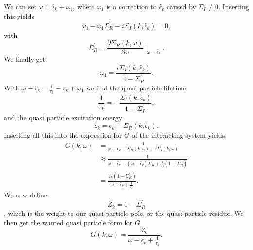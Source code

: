 We can set $\omega=\widetilde{\epsilon_k}+\omega_1$, where $\omega_1$ is a correction to $\widetilde{\epsilon_k}$ caused by $\Sigma_I\neq 0$. Inserting this yields
\begin{equation}
\omega_1-\omega_1\Sigma_R^{\prime}-i\Sigma_I(k,\widetilde{\epsilon_k})=0,
\end{equation}
with
\begin{equation}
\Sigma_R^{\prime}=\frac{\partial \Sigma_R(k,\omega)}{\partial \omega}\mid_{\omega=\widetilde{\epsilon_k}}.
\end{equation}
We finally get
\begin{equation}
\omega_1=\frac{i\Sigma_I(k,\widetilde{\epsilon_k})}{1-\Sigma_R^{\prime}}.
\end{equation}
With $\omega=\widetilde{\epsilon_k}-\frac{i}{\tau_k}=\widetilde{\epsilon_k}+\omega_1$ we find the quasi particle lifetime
\begin{equation}
\frac{1}{\tau_k}=-\frac{\Sigma_I(k,\widetilde{\epsilon_k})}{1-\Sigma_R^{\prime}},
\end{equation}
and the quasi particle excitation energy
\begin{equation}
\widetilde{\epsilon_k}=\epsilon_k+\Sigma_R(k,\widetilde{\epsilon_k}).
\end{equation}
Inserting all this into the expression for $G$ of the interacting system yields
\begin{align}
G(k,\omega)&=\frac{1}{\omega-\epsilon_k-\Sigma_R(k,\omega)-i\Sigma_I(k,\omega)}\\
&\approx\frac{1}{\omega-\widetilde{\epsilon_k}-(\omega-\widetilde{\epsilon_k})\Sigma_R^{\prime}+\frac{i}{\tau_k}(1-\Sigma_R^{\prime})}\\
&=\frac{1/(1-\Sigma_R^{\prime})}{\omega-\widetilde{\epsilon_k}+\frac{1}{\tau_k}}.
\end{align}
We now define 
\begin{equation}
Z_k=1-\Sigma_R^{\prime}
\end{equation},
which is the weight to our quasi particle pole, or the quasi particle residue. We then get the wanted quasi particle form for $G$
\begin{equation}
G(k,\omega)=\frac{Z_k}{\omega-\widetilde{\epsilon_k}+\frac{1}{\tau_k}}.
\end{equation}
